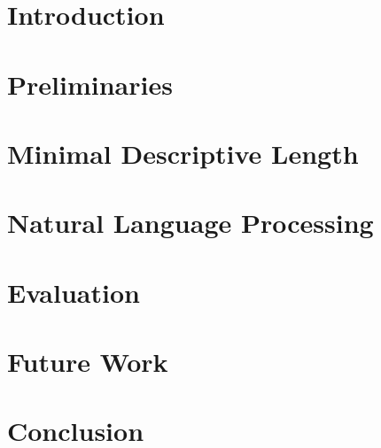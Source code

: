 \documentclass{sig-alternate-05-2015}
\begin{document}
%
%

%
%
\printccsdesc


\section{Introduction} \label{sec:intro}


\section{Preliminaries} \label{sec:background}


\section{Minimal Descriptive Length} \label{sec:mdl}


\section{Natural Language Processing} \label{sec:nlp}


\section{Evaluation} \label{sec:experiments}


\section{Future Work} \label{sec:future}


\section{Conclusion} \label{sec:conclusion}


%

%

%
%

\end{document}
